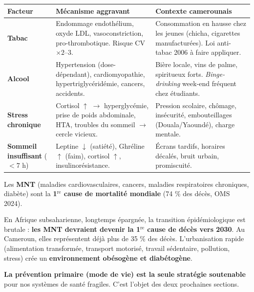 \documentclass[11pt]{article}
\begin{document}
\begin{center}
\begin{tabularx}{\linewidth}{|l|X|X|}\hline
\rowcolor{popblueL}
\textbf{Facteur} & \textbf{Mécanisme aggravant} & \textbf{Contexte camerounais} \\ \hline
\textbf{Tabac} & Endommage endothélium, oxyde LDL, vasoconstriction, pro-thrombotique. Risque CV $\times 2$--$3$. & Consommation en hausse chez les jeunes (chicha, cigarettes manufacturées). Loi anti-tabac 2006 à faire appliquer. \\ \hline
\textbf{Alcool} & Hypertension (dose-dépendant), cardiomyopathie, hypertriglycéridémie, cancers, accidents. & Bière locale, vins de palme, spiritueux forts. \emph{Binge-drinking} week-end fréquent chez étudiants. \\ \hline
\textbf{Stress chronique} & Cortisol $\uparrow$ $\rightarrow$ hyperglycémie, prise de poids abdominale, HTA, troubles du sommeil $\rightarrow$ cercle vicieux. & Pression scolaire, chômage, insécurité, embouteillages (Douala/Yaoundé), charge mentale. \\ \hline
\textbf{Sommeil insuffisant} ($< 7$ h) & Leptine $\downarrow$ (satiété), Ghréline $\uparrow$ (faim), cortisol $\uparrow$, insulinorésistance. & Écrans tardifs, horaires décalés, bruit urbain, promiscuité. \\ \hline
\end{tabularx}
\end{center}

\begin{aretenir}
Les \textbf{MNT} (maladies cardiovasculaires, cancers, maladies respiratoires chroniques, diabète) sont la \textbf{1$^{\text{re}}$ cause de mortalité mondiale} (74 \% des décès, OMS 2024).
\par\medskip
En Afrique subsaharienne, longtemps épargnée, la transition épidémiologique est brutale : \textbf{les MNT devraient devenir la 1$^{\text{re}}$ cause de décès vers 2030}. Au Cameroun, elles représentent déjà plus de 35 \% des décès. L'urbanisation rapide (alimentation transformée, transport motorisé, travail sédentaire, pollution, stress) crée un \textbf{environnement obésogène et diabétogène}.
\par\medskip
\textbf{La prévention primaire (mode de vie) est la seule stratégie soutenable} pour nos systèmes de santé fragiles. C'est l'objet des deux prochaines sections.
\end{aretenir}
\end{document}
